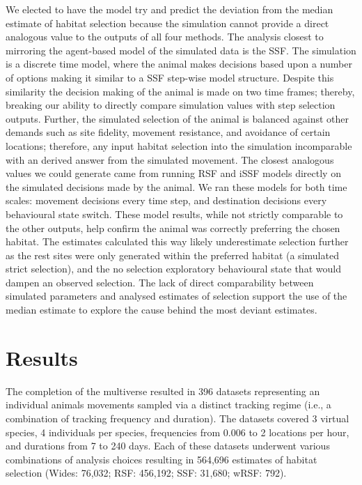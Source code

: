 \documentclass[10pt,a4paper]{article}
\begin{document}
We elected to have the model try and predict the deviation from the median estimate of habitat selection because the simulation cannot provide a direct analogous value to the outputs of all four methods.
The analysis closest to mirroring the agent-based model of the simulated data is the SSF.
The simulation is a discrete time model, where the animal makes decisions based upon a number of options making it similar to a SSF step-wise model structure.
Despite this similarity the decision making of the animal is made on two time frames; thereby, breaking our ability to directly compare simulation values with step selection outputs.
Further, the simulated selection of the animal is balanced against other demands such as site fidelity, movement resistance, and avoidance of certain locations; therefore, any input habitat selection into the simulation incomparable with an derived answer from the simulated movement.
The closest analogous values we could generate came from running RSF and iSSF models directly on the simulated decisions made by the animal.
We ran these models for both time scales: movement decisions every time step, and destination decisions every behavioural state switch.
These model results, while not strictly comparable to the other outputs, help confirm the animal was correctly preferring the chosen habitat.
The estimates calculated this way likely underestimate selection further as the rest sites were only generated within the preferred habitat (a simulated strict selection), and the no selection exploratory behavioural state that would dampen an observed selection.
The lack of direct comparability between simulated parameters and analysed estimates of selection support the use of the median estimate to explore the cause behind the most deviant estimates.

\hypertarget{results}{%
\section{Results}\label{results}}

The completion of the multiverse resulted in 396 datasets representing an individual animals movements sampled via a distinct tracking regime (i.e., a combination of tracking frequency and duration).
The datasets covered 3 virtual species, 4 individuals per species, frequencies from 0.006 to 2 locations per hour, and durations from 7 to 240 days.
Each of these datasets underwent various combinations of analysis choices resulting in
564,696 estimates of habitat selection (Wides: 76,032; RSF: 456,192; SSF: 31,680; wRSF: 792).
\end{document}
